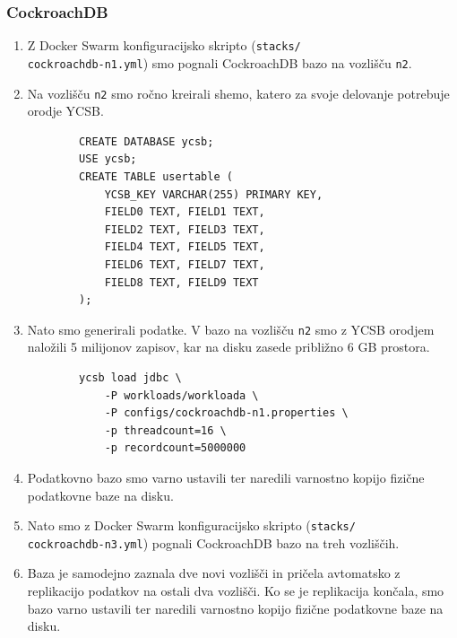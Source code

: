 \documentclass[a4paper, 12pt]{book}
\begin{document}
\subsubsection{CockroachDB}
\begin{enumerate}
    \item Z Docker Swarm konfiguracijsko skripto (\texttt{stacks/\\cockroachdb-n1.yml}) smo pognali CockroachDB bazo na vozlišču \texttt{n2}.
    \item Na vozlišču \texttt{n2} smo ročno kreirali shemo, katero za svoje delovanje potrebuje orodje YCSB.
    \begin{listing}[H]
    \begin{verbatim}
        CREATE DATABASE ycsb;
        USE ycsb;
        CREATE TABLE usertable (
            YCSB_KEY VARCHAR(255) PRIMARY KEY,
            FIELD0 TEXT, FIELD1 TEXT,
            FIELD2 TEXT, FIELD3 TEXT,
            FIELD4 TEXT, FIELD5 TEXT,
            FIELD6 TEXT, FIELD7 TEXT,
            FIELD8 TEXT, FIELD9 TEXT
        );
    \end{verbatim}
    \label{code-ycsb-schema-cockroach}
    \end{listing}
    \item Nato smo generirali podatke. V bazo na vozlišču \texttt{n2} smo z YCSB orodjem naložili 5 milijonov zapisov, kar na disku zasede približno 6 GB prostora.
    \begin{listing}[H]
    \begin{verbatim}
        ycsb load jdbc \
            -P workloads/workloada \
            -P configs/cockroachdb-n1.properties \
            -p threadcount=16 \
            -p recordcount=5000000
    \end{verbatim}
    \label{code-ycsb-load-cockroach}
    \end{listing}
    \item Podatkovno bazo smo varno ustavili ter naredili varnostno kopijo fizične podatkovne baze na disku.
    \item Nato smo z Docker Swarm konfiguracijsko skripto (\texttt{stacks/\\cockroachdb-n3.yml}) pognali CockroachDB bazo na treh vozliščih.
    \item Baza je samodejno zaznala dve novi vozlišči in pričela avtomatsko z replikacijo podatkov na ostali dva vozlišči. Ko se je replikacija končala, smo bazo varno ustavili ter naredili varnostno kopijo fizične podatkovne baze na disku.
\end{enumerate}
\end{document}
